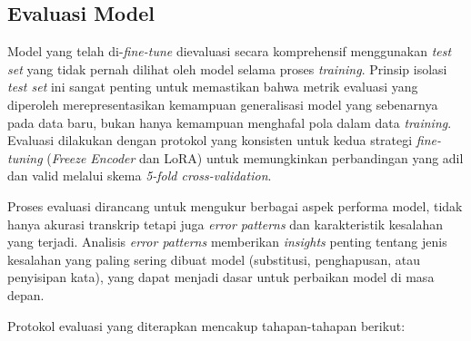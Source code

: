 \subsection{Evaluasi Model}
\label{III.Langkah8}

Model yang telah di-\textit{fine-tune} dievaluasi secara komprehensif menggunakan \textit{test set} yang tidak pernah dilihat oleh model selama proses \textit{training}. Prinsip isolasi \textit{test set} ini sangat penting untuk memastikan bahwa metrik evaluasi yang diperoleh merepresentasikan kemampuan generalisasi model yang sebenarnya pada data baru, bukan hanya kemampuan menghafal pola dalam data \textit{training}. Evaluasi dilakukan dengan protokol yang konsisten untuk kedua strategi \textit{fine-tuning} (\textit{Freeze Encoder} dan LoRA) untuk memungkinkan perbandingan yang adil dan valid melalui skema \textit{5-fold cross-validation}.

Proses evaluasi dirancang untuk mengukur berbagai aspek performa model, tidak hanya akurasi transkrip tetapi juga \textit{error patterns} dan karakteristik kesalahan yang terjadi. Analisis \textit{error patterns} memberikan \textit{insights} penting tentang jenis kesalahan yang paling sering dibuat model (substitusi, penghapusan, atau penyisipan kata), yang dapat menjadi dasar untuk perbaikan model di masa depan.

Protokol evaluasi yang diterapkan mencakup tahapan-tahapan berikut:

